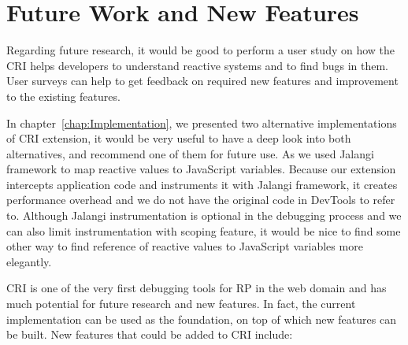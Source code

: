 \section{Future Work and New Features}
Regarding future research, it would be good to perform a user study on how the CRI helps developers to understand reactive systems and to find bugs in them. User surveys can help to get feedback on required new features and improvement to the existing features. 

In chapter~\ref{chap:Implementation}, we presented two alternative implementations of CRI extension, it would be very useful to have a deep look into both alternatives, and recommend one of them for future use. As we used Jalangi framework to map reactive values to JavaScript variables. Because our extension intercepts application code and instruments it with Jalangi framework, it creates performance overhead and we do not have the original code in DevTools to refer to.  Although Jalangi instrumentation is optional in the debugging process and we can also limit instrumentation with scoping feature, it would be nice to find some other way to find reference of reactive values to JavaScript variables more elegantly. 


CRI is one of the very first debugging tools for RP in the web domain and has much potential for future research and new features. In fact, the current implementation can be used as the foundation, on top of which new features can be built. New features that could be added to CRI include:



